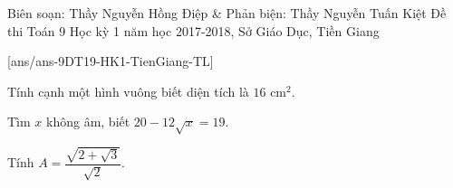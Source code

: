 
\begin{name}
{Biên soạn: Thầy Nguyễn Hồng Điệp \& Phản biện: Thầy Nguyễn Tuấn Kiệt}
{Đề thi Toán 9 Học kỳ 1 năm học 2017-2018, Sở Giáo Dục, Tiền Giang}
\end{name}
\setcounter{bt}{0}
[ans/ans-9DT19-HK1-TienGiang-TL]
\begin{bt}%
Tính cạnh một hình vuông biết diện tích là $16$ cm$^2$.
\end{bt}
\begin{bt}%
Tìm $x$ không âm, biết $20-12\sqrt{x}=19$.
\end{bt}
\begin{bt}%
Tính $A=\dfrac{\sqrt{2+\sqrt{3}}}{\sqrt{2}}$.
\end{bt}	

